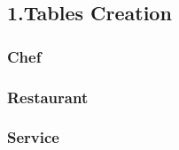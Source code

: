 \subsection*{1.Tables Creation}
\subsubsection*{Chef}

\subsubsection*{Restaurant}

\subsubsection*{Service}


